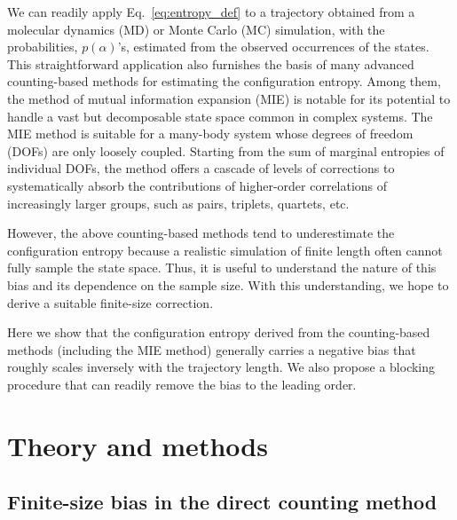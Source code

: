 \documentclass[reprint, superscriptaddress]{revtex4-1}
\begin{document}
We can readily apply Eq.~\eqref{eq:entropy_def} to a trajectory
obtained from a molecular dynamics (MD) or Monte Carlo (MC) simulation,
with the probabilities, $p(\alpha)$'s,
estimated from the observed occurrences of the states.
%
This straightforward application also furnishes the basis
of many advanced counting-based methods for estimating the configuration entropy\cite{hnizdo2007, killian2007}.
%
Among them, the method of mutual information expansion (MIE)\cite{killian2007} is notable
for its potential to handle a vast but decomposable state space common in complex systems.
%
The MIE method is suitable for a many-body system
whose degrees of freedom (DOFs) are only loosely coupled.
%
Starting from the sum of marginal entropies of individual DOFs,
the method offers a cascade of levels of corrections
to systematically absorb the contributions of higher-order correlations
of increasingly larger groups, such as pairs, triplets, quartets, etc.

However, the above counting-based methods
tend to underestimate the configuration entropy
because a realistic simulation of finite length
often cannot fully sample the state space.
%
Thus, it is useful to understand the nature of this bias
and its dependence on the sample size.
%
With this understanding,
we hope to derive a suitable finite-size correction.

Here we show that the configuration entropy derived
from the counting-based methods (including the MIE method)
generally carries a negative bias
that roughly scales inversely with the trajectory length.
%
We also propose a blocking procedure
that can readily remove the bias
to the leading order.
%
%



\section{Theory and methods}

\subsection{\label{sec:fsbias}
Finite-size bias in the direct counting method}
\end{document}
